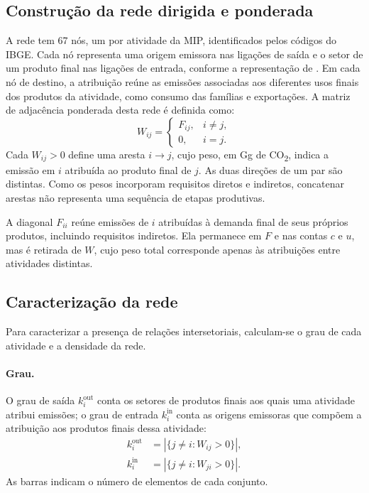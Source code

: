 \subsection{Construção da rede dirigida e ponderada}
\label{sec:construcao-rede}

A rede tem 67 nós, um por atividade da MIP, identificados pelos códigos do IBGE. Cada nó representa uma origem emissora nas ligações de saída e o setor de um produto final nas ligações de entrada, conforme a representação de \textcite{huang2019}. Em cada nó de destino, a atribuição reúne as emissões associadas aos diferentes usos finais dos produtos da atividade, como consumo das famílias e exportações. A matriz de adjacência ponderada desta rede é definida como:
\begin{equation}
W_{ij}=\begin{cases}
F_{ij}, & i\ne j,\\
0, & i=j.
\end{cases}
\label{eq:rede-sem-diagonal}
\end{equation}
Cada $W_{ij}>0$ define uma aresta $i\rightarrow j$, cujo peso, em Gg de CO\textsubscript{2}, indica a emissão em $i$ atribuída ao produto final de $j$. As duas direções de um par são distintas. Como os pesos incorporam requisitos diretos e indiretos, concatenar arestas não representa uma sequência de etapas produtivas.

A diagonal $F_{ii}$ reúne emissões de $i$ atribuídas à demanda final de seus próprios produtos, incluindo requisitos indiretos. Ela permanece em $F$ e nas contas $c$ e $u$, mas é retirada de $W$, cujo peso total corresponde apenas às atribuições entre atividades distintas.

\subsection{Caracterização da rede}
\label{sec:volume-concentracao}

Para caracterizar a presença de relações intersetoriais, calculam-se o grau de cada atividade e a densidade da rede.

\paragraph{Grau.}
O grau de saída $k_i^{\mathrm{out}}$ conta os setores de produtos finais aos quais uma atividade atribui emissões; o grau de entrada $k_i^{\mathrm{in}}$ conta as origens emissoras que compõem a atribuição aos produtos finais dessa atividade:
\begin{equation}
\begin{aligned}
k_i^{\mathrm{out}}&=\left|\{j\ne i:W_{ij}>0\}\right|,\\
k_i^{\mathrm{in}}&=\left|\{j\ne i:W_{ji}>0\}\right|.
\end{aligned}
\label{eq:graus-rede}
\end{equation}
As barras indicam o número de elementos de cada conjunto.

